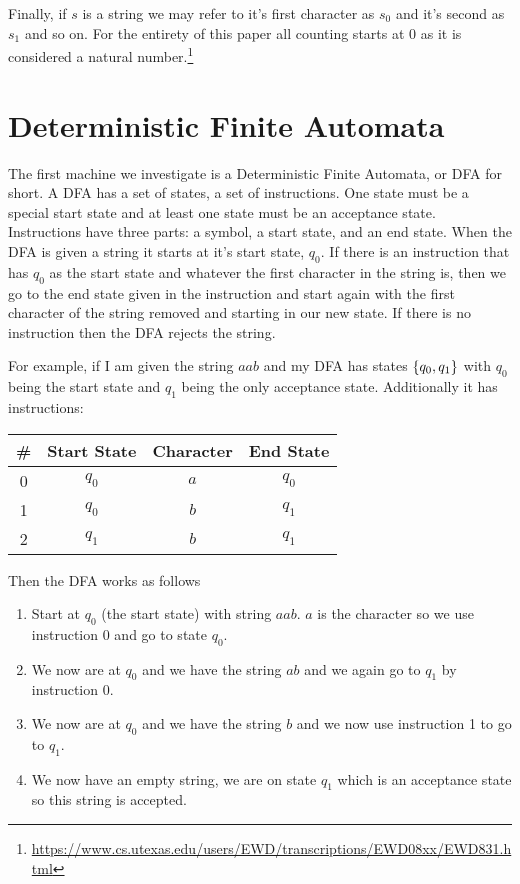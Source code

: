 \documentclass{article}
\begin{document}
	Finally, if $s$ is a string we may refer to it's first character as $s_0$ and it's second as $s_1$ and so on. For the entirety of this paper all counting starts at $0$ as it is considered a natural number.\footnote{\url{https://www.cs.utexas.edu/users/EWD/transcriptions/EWD08xx/EWD831.html}}
	
	\section{Deterministic Finite Automata}
	The first machine we investigate is a Deterministic Finite Automata, or DFA for short. A DFA has a set of states, a set of instructions. One state must be a special start state and at least one state must be an acceptance state. Instructions have three parts: a symbol, a start state, and an end state. When the DFA is given a string it starts at it's start state, $q_0$. If there is an instruction that has $q_0$ as the start state and whatever the first character in the string is, then we go to the end state given in the instruction and start again with the first character of the string removed and starting in our new state. If there is no instruction then the DFA rejects the string. 
	
	For example, if I am given the string $aab$ and my DFA has states $\left\{ {q_0,q_1} \right\}$ with $q_0$ being the start state and $q_1$ being the only acceptance state. Additionally it has instructions:
	\begin{center}
		\begin{tabular}{c|c|c|c}
			\#&Start State & Character & End State\\
			\hline
			0&$q_0$ & $a$ & $q_0$ \\
			1&$q_0$ & $b$ & $q_1$ \\
			2&$q_1$ & $b$ & $q_1$ \\
		\end{tabular}
	\end{center}
	Then the DFA works as follows
	\begin{enumerate}
		\item Start at $q_0$ (the start state) with string $aab$. $a$ is the character so we use instruction 0 and go to state $q_0$.
		\item We now are at $q_0$ and we have the string $ab$ and we again go to $q_1$ by instruction 0.
		\item We now are at $q_0$ and we have the string $b$ and we now use instruction 1 to go to $q_1$.
		\item We now have an empty string, we are on state $q_1$ which is an acceptance state so this string is accepted.
	\end{enumerate}
	
\end{document}
